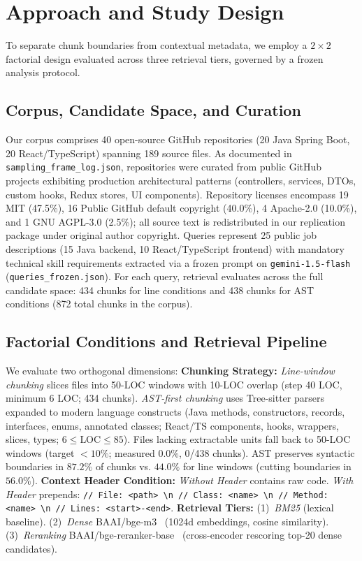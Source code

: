 \section{Approach and Study Design}
\label{sec:approach}

To separate chunk boundaries from contextual metadata, we employ a $2 \times 2$ factorial design evaluated across three retrieval tiers, governed by a frozen analysis protocol.

\subsection{Corpus, Candidate Space, and Curation}
\label{sec:approach:corpus}
Our corpus comprises 40 open-source GitHub repositories (20 Java Spring Boot, 20 React/TypeScript) spanning 189 source files. 
As documented in \texttt{sampling\_frame\_log.json}, repositories were curated from public GitHub projects exhibiting production architectural patterns (controllers, services, DTOs, custom hooks, Redux stores, UI components). 
Repository licenses encompass 19 MIT (47.5\%), 16 Public GitHub default copyright (40.0\%), 4 Apache-2.0 (10.0\%), and 1 GNU AGPL-3.0 (2.5\%); all source text is redistributed in our replication package under original author copyright.
Queries represent 25 public job descriptions (15 Java backend, 10 React/TypeScript frontend) with mandatory technical skill requirements extracted via a frozen prompt on \texttt{gemini-1.5-flash} (\texttt{queries\_frozen.json}). 
For each query, retrieval evaluates across the full candidate space: 434 chunks for line conditions and 438 chunks for AST conditions (872 total chunks in the corpus).

\subsection{Factorial Conditions and Retrieval Pipeline}
\label{sec:approach:factorial}
We evaluate two orthogonal dimensions:
\textbf{Chunking Strategy:} \textit{Line-window chunking} slices files into 50-LOC windows with 10-LOC overlap (step 40 LOC, minimum 6 LOC; 434 chunks). 
\textit{AST-first chunking} uses Tree-sitter parsers expanded to modern language constructs (Java methods, constructors, records, interfaces, enums, annotated classes; React/TS components, hooks, wrappers, slices, types; $6 \le \text{LOC} \le 85$). 
Files lacking extractable units fall back to 50-LOC windows (target $<10\%$; measured $0.0\%$, 0/438 chunks). 
AST preserves syntactic boundaries in $87.2\%$ of chunks vs. $44.0\%$ for line windows (cutting boundaries in $56.0\%$).
\textbf{Context Header Condition:} \textit{Without Header} contains raw code. \textit{With Header} prepends: \texttt{// File: <path> \textbackslash n // Class: <name> \textbackslash n // Method: <name> \textbackslash n // Lines: <start>-<end>}.
\textbf{Retrieval Tiers:} (1)~\textit{BM25} (lexical baseline). (2)~\textit{Dense} BAAI/bge-m3~\cite{chen2024bgem3} (1024d embeddings, cosine similarity). (3)~\textit{Reranking} BAAI/bge-reranker-base~\cite{xiao2023cpack} (cross-encoder rescoring top-20 dense candidates).

